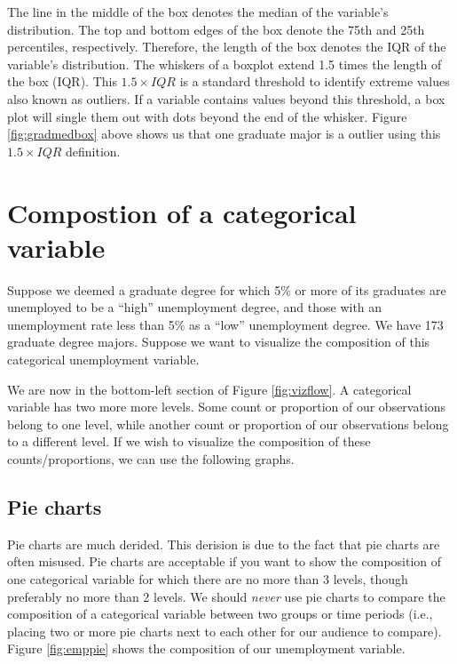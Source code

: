 \documentclass[
]{book}
\begin{document}
The line in the middle of the box denotes the median of the variable's distribution. The top and bottom edges of the box denote the 75th and 25th percentiles, respectively. Therefore, the length of the box denotes the IQR of the variable's distribution. The whiskers of a boxplot extend 1.5 times the length of the box (IQR). This \(1.5 \times IQR\) is a standard threshold to identify extreme values also known as outliers. If a variable contains values beyond this threshold, a box plot will single them out with dots beyond the end of the whisker. Figure \ref{fig:gradmedbox} above shows us that one graduate major is a outlier using this \(1.5 \times IQR\) definition.

\hypertarget{compostion-of-a-categorical-variable}{%
\section{Compostion of a categorical variable}\label{compostion-of-a-categorical-variable}}

Suppose we deemed a graduate degree for which 5\% or more of its graduates are unemployed to be a ``high'' unemployment degree, and those with an unemployment rate less than 5\% as a ``low'' unemployment degree. We have 173 graduate degree majors. Suppose we want to visualize the composition of this categorical unemployment variable.

We are now in the bottom-left section of Figure \ref{fig:vizflow}. A categorical variable has two more more levels. Some count or proportion of our observations belong to one level, while another count or proportion of our observations belong to a different level. If we wish to visualize the composition of these counts/proportions, we can use the following graphs.

\hypertarget{pie-charts}{%
\subsection{Pie charts}\label{pie-charts}}

Pie charts are much derided. This derision is due to the fact that pie charts are often misused. Pie charts are acceptable if you want to show the composition of one categorical variable for which there are no more than 3 levels, though preferably no more than 2 levels. We should \emph{never} use pie charts to compare the composition of a categorical variable between two groups or time periods (i.e., placing two or more pie charts next to each other for our audience to compare). Figure \ref{fig:emppie} shows the composition of our unemployment variable.
\end{document}
